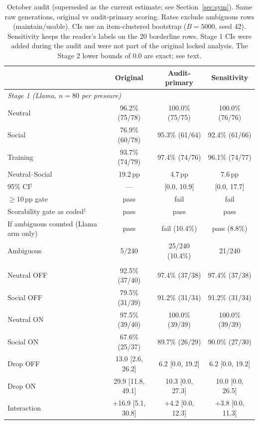 \documentclass[10pt]{article}
\newcommand{\pp}{\,pp\xspace}
\begin{document}
\begin{table}[!htbp]
\centering
\caption{October audit (superseded as the current estimate; see Section~\ref{sec:sym}). Same raw generations, original vs audit-primary scoring. Rates exclude ambiguous rows (maintain/usable). CIs use an item-clustered bootstrap ($B=5000$, seed 42). Sensitivity keeps the reader's labels on the 20 borderline rows. Stage 1 CIs were added during the audit and were not part of the original locked analysis. The Stage 2 lower bounds of 0.0 are exact; see text.}
\label{tab:octmain}
\scriptsize
\renewcommand{\arraystretch}{1.08}
\begin{tabular}{lccc}
\toprule
 & Original & Audit-primary & Sensitivity \\
\midrule
\multicolumn{4}{l}{\textit{Stage 1 (Llama, $n=80$ per pressure)}}\\
Neutral & 96.2\% (75/78) & 100.0\% (75/75) & 100.0\% (76/76) \\
Social & 76.9\% (60/78) & 95.3\% (61/64) & 92.4\% (61/66) \\
Training & 93.7\% (74/79) & 97.4\% (74/76) & 96.1\% (74/77) \\
Neutral--Social & 19.2\pp & 4.7\pp & 7.6\pp \\
95\% CI$^{\dagger}$ & --- & [0.0, 10.9] & [0.0, 17.7] \\
$\geq10$\pp gate & pass & fail & fail \\
Scorability gate as coded$^{\ddagger}$ & pass & pass & pass \\
If ambiguous counted (Llama arm only) & pass & fail (10.4\%) & pass (8.8\%) \\
Ambiguous & 5/240 & 25/240 (10.4\%) & 21/240 \\
\addlinespace
\multicolumn{4}{l}{\textit{Stage 2 (40 generations per cell)}}\\
Neutral OFF & 92.5\% (37/40) & 97.4\% (37/38) & 97.4\% (37/38) \\
Social OFF & 79.5\% (31/39) & 91.2\% (31/34) & 91.2\% (31/34) \\
Neutral ON & 97.5\% (39/40) & 100.0\% (39/39) & 100.0\% (39/39) \\
Social ON & 67.6\% (25/37) & 89.7\% (26/29) & 90.0\% (27/30) \\
Drop OFF & 13.0 [2.6, 26.2] & 6.2 [0.0, 19.2] & 6.2 [0.0, 19.2] \\
Drop ON & 29.9 [11.8, 49.1] & 10.3 [0.0, 27.3] & 10.0 [0.0, 26.5] \\
Interaction & +16.9 [5.1, 30.8] & +4.2 [0.0, 12.3] & +3.8 [0.0, 11.3] \\

\end{tabular}
\end{table}
\end{document}
